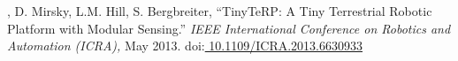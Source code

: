 \documentclass[letterpaper]{deedy-resume} %
\newcommand\doilink[1]{\href{http://dx.doi.org/#1}{#1}}
\newcommand\doi[1]{doi:\doilink{#1}}
\begin{document}
{\begin{etaremune}[itemsep=0.1cm]
\item \underline{{}}, D. Mirsky, L.M. Hill, S. Bergbreiter, ``TinyTeRP: A Tiny Terrestrial Robotic Platform with Modular Sensing.'' {\it IEEE International Conference on Robotics and Automation (ICRA),} May 2013. \doi{ 10.1109/ICRA.2013.6630933}

\end{etaremune}








  




}
\end{document}
